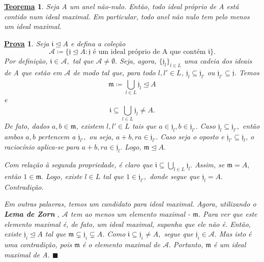 \documentclass{article}
\newtheorem*{theorem*}{\underline{Teorema}}
\newtheorem*{proof*}{\underline{Prova}}
\renewcommand\qedsymbol{$\blacksquare$}
\begin{document}
\begin{theorem*}
  Seja A um anel não-nulo. Então, todo ideal próprio de A está contido num ideal maximal. Em particular, todo anel
não nulo tem pelo menos um ideal maximal.
\end{theorem*}
\begin{proof*}
  Seja \(\mathfrak{i}\trianglelefteq A\) e defina a coleção 
  \[
    \mathcal{A} \coloneqq \{\mathfrak{j}\trianglelefteq A: \mathfrak{j} \text{ é um ideal próprio de A que contém }\mathfrak{i}\}.
  \]
  Por definição, \(\mathfrak{i}\in \mathcal{A},\) tal que \(\mathcal{A}\neq\emptyset.\) Seja, agora, \(\{\mathfrak{j}_{l}\}_{l\in L}\) uma cadeia
dos ideais de A que estão em \(\mathcal{A}\) de modo tal que, para todo \(l, l'\in L\),
 \(\mathfrak{j}_{l}\subseteq \mathfrak{j}_{l'}\) ou \(\mathfrak{j}_{l'}\subseteq \mathfrak{j}\). Temos 
  \[
    \mathfrak{m}\coloneqq \bigcup_{l\in L}^{}\mathfrak{j}_{l}\trianglelefteq A
  \]
e 
  \[
    \mathfrak{i}\subseteq \bigcup_{l\in L}^{}\mathfrak{j}_{l}\neq A.
  \]
  De fato, dados \(a, b\in \mathfrak{m}\), existem \(l, l'\in L\) tais que \(a\in \mathfrak{j}_{l}, b\in \mathfrak{j}_{l'}\).
Caso \(\mathfrak{j}_{l}\subseteq \mathfrak{j}_{l'},\) então ambos \(a, b\) pertencem a \(\mathfrak{j}_{l'},\) ou seja, \(a + b, ra\in \mathfrak{j}_{l'}.\) Caso
seja o oposto e \(\mathfrak{j}_{l'}\subseteq \mathfrak{j}_{l}\), o raciocínio aplica-se para \(a + b, ra\in \mathfrak{j}_{l}\). Logo, \(\mathfrak{m}\trianglelefteq A.\)

  Com relação à segunda propriedade, é claro que \(\mathfrak{i}\subseteq \bigcup_{l\in L}^{}\mathfrak{j}_{l}.\) Assim, se
 \(\mathfrak{m} = A,\) então \(1\in \mathfrak{m}.\) Logo, existe \(l\in L\) tal que \(1\in \mathfrak{j}_{l'},\) donde segue que 
  \(\mathfrak{j}_{l} = A.\) Contradição.

  Em outras palavras, temos um candidato para ideal maximal. Agora, utilizando o \textbf{Lema de Zorn} , \(\mathcal{A}\) tem
ao menos um elemento maximal - \(\mathfrak{m}\). Para ver que este elemento maximal é, de fato, um ideal maximal, suponha que ele não é. Então, existe \(\mathfrak{j}_{i} \trianglelefteq A\) tal que 
 \(\mathfrak{m}\subsetneq \mathfrak{j}_{i} \subsetneq A\). Como \(\mathfrak{i}\subseteq \mathfrak{j}_{i}\neq A,\) segue que \(\mathfrak{j}_{i}\in \mathcal{A}.\) Mas isto é uma contradição,
 pois \(\mathfrak{m}\) é o elemento maximal de \(\mathcal{A}.\) Portanto, \(\mathfrak{m}\) é um ideal maximal de A. \qedsymbol
\end{proof*}
\end{document}
